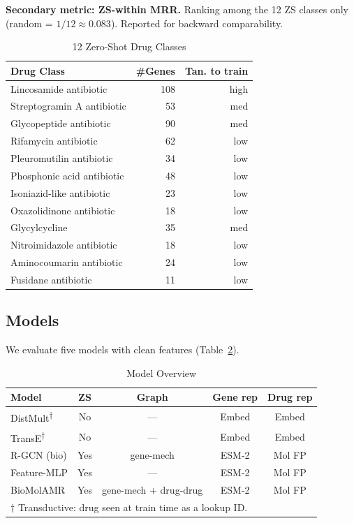 \documentclass[conference]{IEEEtran}
\begin{document}
\textbf{Secondary metric: ZS-within MRR.} Ranking among the 12 ZS classes
only (random = $1/12 \approx 0.083$). Reported for backward comparability.

\begin{table}[t]
\centering
\caption{12 Zero-Shot Drug Classes}
\label{tab:zs_classes}
\small
\begin{tabular}{lrr}
\toprule
Drug Class & \#Genes & Tan. to train \\
\midrule
Lincosamide antibiotic        & 108 & high \\
Streptogramin A antibiotic    &  53 & med  \\
Glycopeptide antibiotic       &  90 & med  \\
Rifamycin antibiotic          &  62 & low  \\
Pleuromutilin antibiotic      &  34 & low  \\
Phosphonic acid antibiotic    &  48 & low  \\
Isoniazid-like antibiotic     &  23 & low  \\
Oxazolidinone antibiotic      &  18 & low  \\
Glycylcycline                 &  35 & med  \\
Nitroimidazole antibiotic     &  18 & low  \\
Aminocoumarin antibiotic      &  24 & low  \\
Fusidane antibiotic           &  11 & low  \\
\bottomrule
\end{tabular}
\end{table}

\subsection{Models}
\label{sec:models}

We evaluate five models with clean features (Table~\ref{tab:models_overview}).

\begin{table}[t]
\centering
\caption{Model Overview}
\label{tab:models_overview}
\small
\begin{tabular}{lcccc}
\toprule
Model & ZS & Graph & Gene rep & Drug rep \\
\midrule
DistMult\textsuperscript{$\dagger$}  & No  & —      & Embed & Embed \\
TransE\textsuperscript{$\dagger$}    & No  & —      & Embed & Embed \\
R-GCN (bio)     & Yes & gene-mech & ESM-2 & Mol FP \\
Feature-MLP     & Yes & —         & ESM-2 & Mol FP \\
BioMolAMR       & Yes & gene-mech + drug-drug & ESM-2 & Mol FP \\
\bottomrule
\multicolumn{5}{l}{\small $\dagger$ Transductive: drug seen at train time as a lookup ID.}
\end{tabular}
\end{table}
\end{document}
